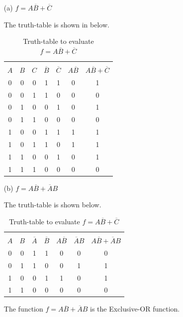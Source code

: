 \begin{solution}
\begin{itemize}
\item[(a)] $f=A\overline{B}+\overline{C}$

The truth-table is shown in below.
\begin{table}[H]
\centering
\caption*{Truth-table to evaluate $f=A\overline{B}+\overline{C}$}
\tabcolsep=6pt
\renewcommand{\arraystretch}{1.15}
\begin{tabular}{|ccc|cccc|}
\hline
&&&&&&\\[-15pt]
\boldmath$A$ & \boldmath$B$ & \boldmath$C$ & \boldmath$\overline{B}$ & \boldmath$\overline{C}$ & \boldmath$A\overline{B}$ & \boldmath$A\overline{B}+\overline{C}$\\
\hline
0 & 0 & 0 & 1 & 1 & 0 & 1\\
0 & 0 & 1 & 1 & 0 & 0 & 0\\
0 & 1 & 0 & 0 & 1 & 0 & 1\\
0 & 1 & 1 & 0 & 0 & 0 & 0\\
1 & 0 & 0 & 1 & 1 & 1 & 1\\
1 & 0 & 1 & 1 & 0 & 1 & 1\\
1 & 1 & 0 & 0 & 1 & 0 & 1\\
1 & 1 & 1 & 0 & 0 & 0 & 0\\
\hline
\end{tabular}
\end{table}

\item[(b)] $f=A\overline{B}+\overline{A}B$

The truth-table is shown below.
\begin{table}[H]
\centering
\caption*{Truth-table to evaluate $f=A\overline{B}+\overline{C}$}
\tabcolsep=6pt
\renewcommand{\arraystretch}{1.15}
\begin{tabular}{|cc|ccccc|}
\hline
&&&&&&\\[-14pt]
\boldmath$A$ & \boldmath$B$ & \boldmath$\overline{A}$ & \boldmath$\overline{B}$ & \boldmath$A\overline{B}$ & \boldmath$\overline{A}B$ & \boldmath$A\overline{B}+\overline{A}B$\\
\hline
0 & 0 & 1 & 1 & 0 & 0 & 0\\
0 & 1 & 1 & 0 & 0 & 1 & 1\\
1 & 0 & 0 & 1 & 1 & 0 & 1\\
1 & 1 & 0 & 0 & 0 & 0 & 0\\
\hline
\end{tabular}
\end{table}
The function $f=A\overline{B}+\overline{A}B$ is the Exclusive-OR function.


\end{itemize}
\end{solution}
